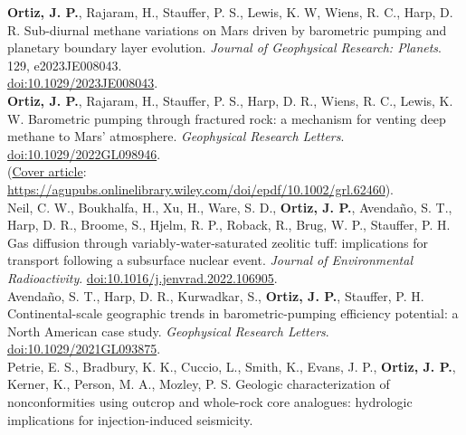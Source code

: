 \documentclass[11pt, letterpaper]{article}
\newcommand{\years}[1]{\marginnote{\scriptsize #1}}
\begin{document}
\noindent
\hypersetup{linkcolor=black,citecolor=blue,filecolor=black,urlcolor=black} 
\textbf{\years{2024}}\textbf{Ortiz, J. P.}, Rajaram, H., Stauffer, P. S., Lewis, K. W,
Wiens, R. C., Harp, D. R.  Sub-diurnal methane variations on Mars driven by
barometric pumping and planetary boundary layer evolution.  \emph{Journal of
Geophysical Research: Planets}. 129, e2023JE008043.\\
\href{https://agupubs.onlinelibrary.wiley.com/doi/epdf/10.1029/2023JE008043}{doi:10.1029/2023JE008043}.\\ 
%
\textbf{\years{2022}}\textbf{Ortiz, J. P.}, Rajaram, H., Stauffer, P. S., Harp, D. R.,
Wiens, R. C., Lewis, K. W.  Barometric pumping through fractured rock: a
mechanism for venting deep methane to Mars' atmosphere.  \emph{Geophysical
Research Letters}. 
\href{https://agupubs.onlinelibrary.wiley.com/doi/epdf/10.1029/2022GL098946}{doi:10.1029/2022GL098946}. \\
\hypersetup{linkcolor=black,citecolor=blue,filecolor=black,urlcolor=blue} 
(\underline{Cover article}:
\href{https://agupubs.onlinelibrary.wiley.com/doi/epdf/10.1002/grl.62460}{https://agupubs.onlinelibrary.wiley.com/doi/epdf/10.1002/grl.62460}).\\ 
%
\hypersetup{linkcolor=black,citecolor=blue,filecolor=black,urlcolor=black} 
\years{2022}Neil, C. W., Boukhalfa, H., Xu, H., Ware, S. D., \textbf{Ortiz, J.
P.}, Avendaño, S. T., Harp, D. R., Broome, S., Hjelm, R. P., Roback, R., Brug,
W. P., Stauffer, P. H. Gas diffusion through variably-water-saturated zeolitic
tuff: implications for transport following a subsurface nuclear event.
\emph{Journal of Environmental Radioactivity}.
\href{https://www.sciencedirect.com/science/article/pii/S0265931X22000959/pdfft?md5=9a2aafb80eab7a1daa481601c5af9247&pid=1-s2.0-S0265931X22000959-main.pdf}{doi:10.1016/j.jenvrad.2022.106905}.\\
%
\years{2021}Avendaño, S. T., Harp, D. R., Kurwadkar, S., \textbf{Ortiz, J.
P.}, Stauffer, P. H. Continental-scale geographic trends in barometric-pumping
efficiency potential: a North American case study.
\emph{Geophysical Research Letters}.  
\href{https://agupubs.onlinelibrary.wiley.com/doi/pdf/10.1029/2021GL093875}{doi:10.1029/2021GL093875}.\\
%
\years{2020}Petrie, E. S., Bradbury, K. K., Cuccio, L., Smith, K., Evans, J.
P., \textbf{Ortiz, J. P.}, Kerner, K., Person, M. A., Mozley, P. S.
Geologic characterization of nonconformities using outcrop and whole-rock core
analogues: hydrologic implications for injection-induced seismicity.
\end{document}
